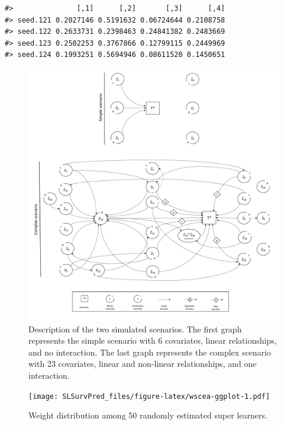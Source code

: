 \begin{verbatim}
#>               [,1]      [,2]       [,3]      [,4]
#> seed.121 0.2027146 0.5191632 0.06724644 0.2108758
#> seed.122 0.2633731 0.2398463 0.24841382 0.2483669
#> seed.123 0.2502253 0.3767866 0.12799115 0.2449969
#> seed.124 0.1993251 0.5694946 0.08611520 0.1450651
\end{verbatim}

\clearpage

\begin{figure}
\includegraphics[width=1\linewidth]{DAG} \caption{Description of the two simulated scenarios. The first graph represents the simple scenario with 6 covariates, linear relationships, and no interaction. The last  graph  represents the complex scenario with 23 covariates, linear and non-linear relationships, and one interaction.}\label{fig:scenarios}
\end{figure}

\clearpage

\begin{figure}
\centering
\texttt{[image: SLSurvPred\_files/figure-latex/wscea-ggplot-1.pdf]}
\caption{\label{fig:wscea-ggplot}Weight distribution among 50 randomly estimated super learners.}
\end{figure}

\clearpage

